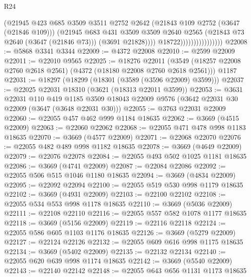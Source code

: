 \begin{lexlean}{R24}
\begin{coremodule}
                                      (@21945
                                        @423
                                        @685
                                        @3509
                                        @3511
                                        @2752
                                        @2642
                                        (@21843 @109 @2752 (@3647 (@21846 @109)))
                                        (@21945
                                          @683
                                          @431
                                          @3509
                                          @3509
                                          @2640
                                          @2565
                                          (@21843 @73 @2640 (@3647 (@21846 @73)))
                                          (@3691 @21828))))
                                    @18722))))))))))))))))
@22008 := @5868 @3341 @3344
@22009 := @4372 @22008
@22010 := @2599 @22009
@22011 := @22010 @9565
@22025 := @18276
    @22011
    (@3549 (@18257 @22008 @2760 @2618 @2561) (@4372 (@18180 @22008 @2760 @2618 @2561)))
    @1187
@22031 := @18297 (@18299 (@18301 (@3589 (@3596 @22009) @3599)))
@22037 := @22025 @22031 @18310 (@3621 (@18313 @22011 @3599))
@22053 := @3631
    @22031
    @110
    @419
    @1185
    @3509
    @18043
    @22009
    @9576
    (@3642 @22031 @30 @22009 (@3647 (@3648 @22031 @30)))
@22055 := @3763 @22031 @22009
@22060 := @22055 @457 @462 @999 @1184 @18635
@22062 := @3669 (@4515 @22009)
@22063 := @22060 @22062
@22068 := @22055 @471 @478 @998 @1183 @18635
@22070 := @3669 (@4577 @22009)
@22071 := @22068 @22070
@22076 := @22055 @482 @489 @998 @1182 @18635
@22078 := @3669 (@4649 @22009)
@22079 := @22076 @22078
@22084 := @22055 @493 @502 @1025 @1181 @18635
@22086 := @3669 (@4741 @22009)
@22087 := @22084 @22086
@22092 := @22055 @506 @515 @1046 @1180 @18635
@22094 := @3669 (@4834 @22009)
@22095 := @22092 @22094
@22100 := @22055 @519 @530 @998 @1179 @18635
@22102 := @3669 (@4931 @22009)
@22103 := @22100 @22102
@22108 := @22055 @534 @553 @998 @1178 @18635
@22110 := @3669 (@5036 @22009)
@22111 := @22108 @22110
@22116 := @22055 @557 @582 @1078 @1177 @18635
@22118 := @3669 (@5156 @22009)
@22119 := @22116 @22118
@22124 := @22055 @586 @605 @1103 @1176 @18635
@22126 := @3669 (@5279 @22009)
@22127 := @22124 @22126
@22132 := @22055 @609 @616 @998 @1175 @18635
@22134 := @3669 (@5402 @22009)
@22135 := @22132 @22134
@22140 := @22055 @620 @639 @998 @1174 @18635
@22142 := @3669 (@5540 @22009)
@22143 := @22140 @22142
@22148 := @22055 @643 @656 @1131 @1173 @18635

\end{coremodule}
\end{lexlean}
